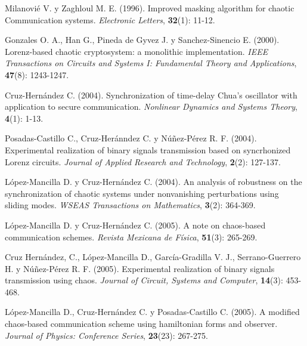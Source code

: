 \begin{thebibliography}{00}
Milanovié V. y Zaghloul M. E. (1996).
\newblock Improved masking algorithm for chaotic Communication systems.
\newblock \emph{Electronic Letters}, \textbf{32}(1): 11-12.

Gonzales O. A., Han G., Pineda de Gyvez J. y Sanchez-Sinencio E. (2000).
\newblock Lorenz-based chaotic cryptosystem: a monolithic implementation.
\newblock \emph{IEEE Transactions on Circuits and Systems I: Fundamental Theory and Applications}, \textbf{47}(8): 1243-1247.

Cruz-Hernández C. (2004).
\newblock Synchronization of time-delay Chua's oscillator with application to secure communication.
\newblock \emph{Nonlinear Dynamics and Systems Theory}, \textbf{4}(1): 1-13.

Posadas-Castillo C., Cruz-Heránndez C. y Núñez-Pérez R. F. (2004).
\newblock Experimental realization of binary signals transmission based on syncrhonized Lorenz circuits.
\newblock \emph{Journal of Applied Research and Technology}, \textbf{2}(2): 127-137.

López-Mancilla D. y Cruz-Hernández C. (2004).
\newblock An analysis of robustness on the synchronization of chaotic systems under nonvanishing perturbations using sliding modes.
\newblock \emph{WSEAS Transactions on Mathematics}, \textbf{3}(2): 364-369.

López-Mancilla D. y Cruz-Hernández C. (2005).
\newblock A note on chaos-based communication schemes.
\newblock \emph{Revista Mexicana de Física}, \textbf{51}(3): 265-269.

Cruz Hernández, C., López-Mancilla D., García-Gradilla V. J., Serrano-Guerrero H. y Núñez-Pérez R. F. (2005).
\newblock Experimental realization of binary signals transmission using chaos.
\newblock \emph{Journal of Circuit, Systems and Computer}, \textbf{14}(3): 453-468.

López-Mancilla D., Cruz-Hernández C. y Posadas-Castillo C. (2005).
\newblock A modified chaos-based communication scheme using hamiltonian forms and observer.
\newblock \emph{Journal of Physics: Conference Series}, \textbf{23}(23): 267-275.


\end{thebibliography}
